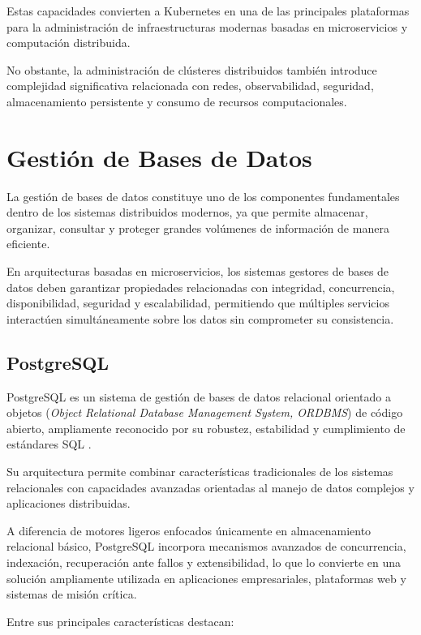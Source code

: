 \documentclass[12pt, oneside, letterpaper]{book}
\begin{document}
Estas capacidades convierten a Kubernetes en una de las principales plataformas para la administración de infraestructuras modernas basadas en microservicios y computación distribuida.

No obstante, la administración de clústeres distribuidos también introduce complejidad significativa relacionada con redes, observabilidad, seguridad, almacenamiento persistente y consumo de recursos computacionales.

\section{Gestión de Bases de Datos}

La gestión de bases de datos constituye uno de los componentes fundamentales dentro de los sistemas distribuidos modernos, ya que permite almacenar, organizar, consultar y proteger grandes volúmenes de información de manera eficiente. 

En arquitecturas basadas en microservicios, los sistemas gestores de bases de datos deben garantizar propiedades relacionadas con integridad, concurrencia, disponibilidad, seguridad y escalabilidad, permitiendo que múltiples servicios interactúen simultáneamente sobre los datos sin comprometer su consistencia.

\subsection{PostgreSQL}

PostgreSQL es un sistema de gestión de bases de datos relacional orientado a objetos (\textit{Object Relational Database Management System, ORDBMS}) de código abierto, ampliamente reconocido por su robustez, estabilidad y cumplimiento de estándares SQL \cite{42}.

Su arquitectura permite combinar características tradicionales de los sistemas relacionales con capacidades avanzadas orientadas al manejo de datos complejos y aplicaciones distribuidas.

A diferencia de motores ligeros enfocados únicamente en almacenamiento relacional básico, PostgreSQL incorpora mecanismos avanzados de concurrencia, indexación, recuperación ante fallos y extensibilidad, lo que lo convierte en una solución ampliamente utilizada en aplicaciones empresariales, plataformas web y sistemas de misión crítica.

Entre sus principales características destacan:
\end{document}
